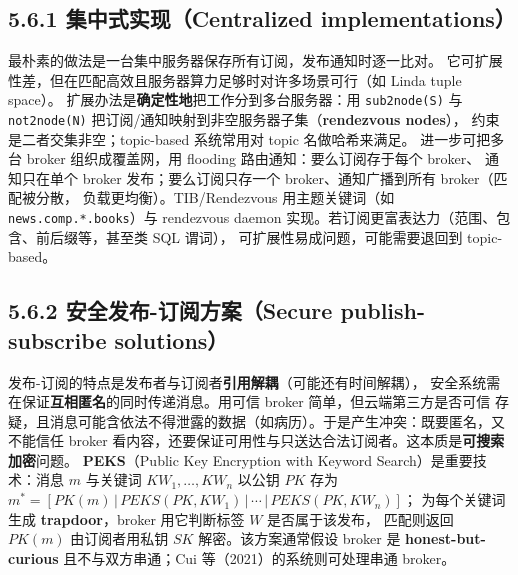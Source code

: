 \subsection*{5.6.1 集中式实现（Centralized implementations）}
最朴素的做法是一台集中服务器保存所有订阅，发布通知时逐一比对。
它可扩展性差，但在匹配高效且服务器算力足够时对许多场景可行（如 Linda tuple space）。
扩展办法是\textbf{确定性地}把工作分到多台服务器：用 \texttt{sub2node(S)} 与
\texttt{not2node(N)} 把订阅/通知映射到非空服务器子集（\textbf{rendezvous nodes}），
约束是二者交集非空；topic-based 系统常用对 topic 名做哈希来满足。
进一步可把多台 broker 组织成覆盖网，用 flooding 路由通知：要么订阅存于每个 broker、
通知只在单个 broker 发布；要么订阅只存一个 broker、通知广播到所有 broker（匹配被分散，
负载更均衡）。TIB/Rendezvous 用主题关键词（如 \texttt{news.comp.*.books}）与
rendezvous daemon 实现。若订阅更富表达力（范围、包含、前后缀等，甚至类 SQL 谓词），
可扩展性易成问题，可能需要退回到 topic-based。

\subsection*{5.6.2 安全发布-订阅方案（Secure publish-subscribe solutions）}
发布-订阅的特点是发布者与订阅者\textbf{引用解耦}（可能还有时间解耦），
安全系统需在保证\textbf{互相匿名}的同时传递消息。用可信 broker 简单，但云端第三方是否可信
存疑，且消息可能含依法不得泄露的数据（如病历）。于是产生冲突：既要匿名，又不能信任 broker
看内容，还要保证可用性与只送达合法订阅者。这本质是\textbf{可搜索加密}问题。
\textbf{PEKS}（Public Key Encryption with Keyword Search）是重要技术：消息 $m$ 与关键词
$KW_1,\dots,KW_n$ 以公钥 $PK$ 存为
$m^* = [PK(m)\,|\,PEKS(PK,KW_1)\,|\,\cdots\,|\,PEKS(PK,KW_n)]$；
为每个关键词生成 \textbf{trapdoor}，broker 用它判断标签 $W$ 是否属于该发布，
匹配则返回 $PK(m)$ 由订阅者用私钥 $SK$ 解密。该方案通常假设 broker 是
\textbf{honest-but-curious} 且不与双方串通；Cui 等（2021）的系统则可处理串通 broker。

\begin{closeread}
\end{closeread}

